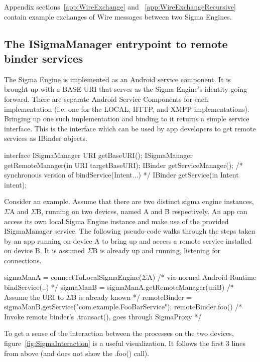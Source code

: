 \documentclass[prodmode]{acmlarge}
\begin{document}
Appendix sections~\ref{app:WireExchange} and ~\ref{app:WireExchangeRecursive} contain example exchanges of Wire messages between two Sigma Engines.

\subsection{The ISigmaManager entrypoint to remote binder services}
\label{sec:SigmaAsABinderService}
The Sigma Engine is implemented as an Android service component. It is brought up with a BASE URI that serves as the Sigma Engine's identity going forward. There are separate Android Service Components for each implementation (i.e. one for the LOCAL, HTTP, and XMPP implementations). Bringing up one such implementation and binding to it returns a simple service interface. This is the interface which can be used by app developers to get remote services as IBinder objects.

\begin{snippet}
interface ISigmaManager {
    URI getBaseURI();
    ISigmaManager getRemoteManager(in URI targetBaseURI);
    IBinder getServiceManager();
    /* synchronous version of bindService(Intent...) */
    IBinder getService(in Intent intent);
}
\end{snippet}

Consider an example. Assume that there are two distinct sigma engine instances, $\Sigma$A and $\Sigma$B, running on two devices, named A and B respectively. An app can access its own local Sigma Engine instance and make use of the provided ISigmaManager service. The following pseudo-code walks through the steps taken by an app running on device A to bring up and access a remote service installed on device B. It is assumed $\Sigma$B is already up and running, listening for connections.

\begin{snippet}
sigmaManA = connectToLocalSigmaEngine($\Sigma$A) /* via normal Android Runtime bindService(..) */
sigmaManB = sigmaManA.getRemoteManager(uriB) /*  Assume the URI to $\Sigma$B is already known */
remoteBinder = sigmaManB.getService("com.example.FooBarService");
remoteBinder.foo() /* Invoke remote binder's .transact(), goes through SigmaProxy */
\end{snippet}

To get a sense of the interaction between the processes on the two devices, figure~\ref{fig:SigmaInteraction} is a useful visualization. It follows the first 3 lines from above (and does not show the .foo() call).
\end{document}
